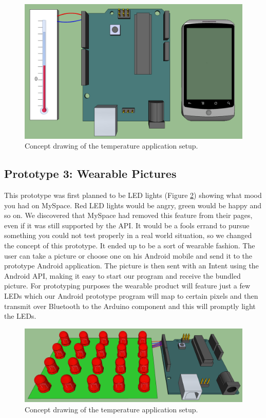 \begin{figure}
	\begin{center}
	\includegraphics[scale=0.35]{img/design-temperature}
	\end{center}
	\caption{Concept drawing of the temperature application setup.}
	\label{fig:design-temperature}
\end{figure}

\subsection{Prototype 3: Wearable Pictures}
This prototype was first planned to be LED lights (Figure \ref{fig:design-ledmatrix}) showing what mood you had on MySpace. Red LED lights would be angry,
green would be happy and so on. We discovered that MySpace had removed this feature from their pages, even if it was
still supported by the API. It would be a fools errand to pursue something you could not test properly
in a real world situation, so we changed the concept of this prototype. It ended up to be a sort of wearable fashion.
The user can take a picture or choose one on his Android mobile and send it to the prototype Android application.
The picture is then sent with an Intent using the Android API, making it easy to start our program and receive
the bundled picture. For prototyping purposes the wearable product will feature just a few LEDs which our Android
prototype program will map to certain pixels and then transmit over Bluetooth to the Arduino
component and this will promptly light the LEDs.

\begin{figure}
	\begin{center}
	\includegraphics[scale=0.35]{img/design-ledmatrix}
	\end{center}
	\caption{Concept drawing of the temperature application setup.}
	\label{fig:design-ledmatrix}
\end{figure}

